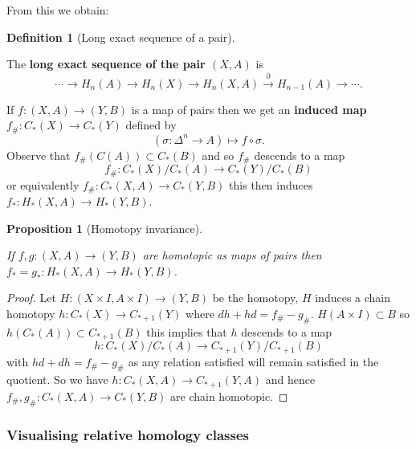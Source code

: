 \documentclass[10pt,]{book}
\newcommand{\terminology}[1]{\textbf{#1}}
\theoremstyle{plain}
\newtheorem{proposition}[theorem]{Proposition}
\theoremstyle{definition}
\newtheorem{definition}[theorem]{Definition}
\numberwithin{equation}{section}
\begin{document}
            From this we obtain:
\begin{definition}[Long exact sequence of a pair]\label{definition-15}

              The \terminology{long exact sequence of the pair \((X,A)\)} is
              \[ \cdots \to H_n(A) \to H_n(X) \to H_n(X,A) \xrightarrow{\partial} H_{n-1} (A) \to \cdots.\]\end{definition}
\par

            If \(f\colon (X,A) \to (Y,B)\) is a map of pairs then we get an \terminology{induced map} \(f_\# \colon C_*(X) \to C_*(Y)\) defined by
            \[
              (\sigma\colon \Delta^n \to A) \mapsto f\circ \sigma.
            \]
            Observe that \(f_\#(C(A)) \subset C_*(B)\) and so \(f_\#\) descends to a map
            \[
              f_\#\colon C_*(X)/C_*(A) \to C_*(Y)/C_*(B)
            \]
            or equivalently \(f_\#\colon C_*(X,A) \to C_*(Y,B)\) this then induces \(f_*\colon H_*(X,A) \to H_*(Y,B)\).
\begin{proposition}[Homotopy invariance]\label{proposition-2}

              If \(f,g \colon (X,A) \to (Y,B)\) are homotopic as maps of pairs then \(f_* = g_* \colon H_*(X,A) \to H_*(Y,B)\).
            \end{proposition}
\begin{proof}

              Let \(H\colon (X\times I, A\times I) \to (Y,B)\) be the homotopy, \(H\) induces a chain homotopy \(h \colon C_*(X) \to C_{*+1}(Y)\) where \(dh + hd = f_\# - g_\#\).
              \(H(A\times I) \subset B\) so \(h(C_*(A)) \subset C_{*+1}(B)\) this implies that \(h\) descends to a map
              \[
                h \colon C_*(X)/C_*(A) \to C_{*+1}(Y)/C_{*+1}(B)
              \]
              with \(hd + dh = f_\# - g_\#\) as any relation satisfied will remain satisfied in the quotient.
              So we have \(h \colon C_*(X,A) \to C_{*+1}(Y,A)\) and hence \(f_\#,g_\#\colon C_*(X,A) \to C_*(Y,B)\) are chain homotopic.
            \end{proof}
\typeout{************************************************}
\typeout{************************************************}
\subsubsection[Visualising relative homology classes]{Visualising relative homology classes}\label{subsubsection-2}
\end{document}
